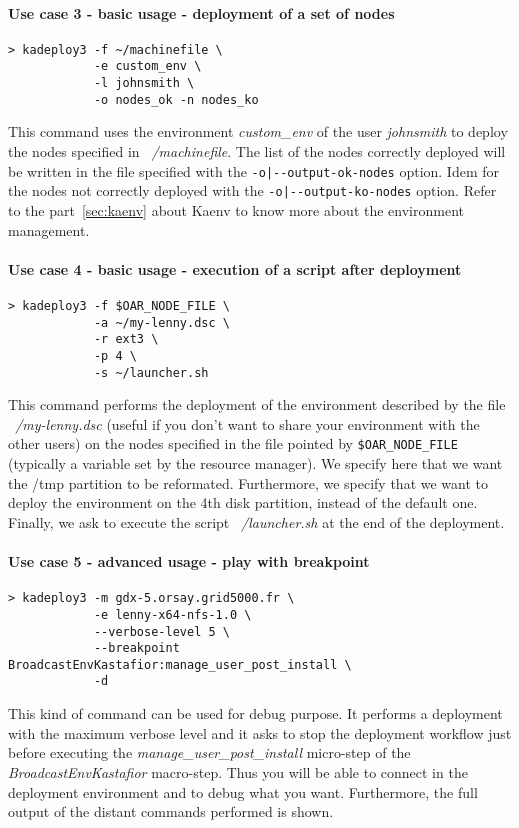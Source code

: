 \documentclass[a4wide,10pt,oneside]{book}
\begin{document}
\paragraph{Use case 3 - basic usage - deployment of a set of nodes}
\begin{verbatim}
> kadeploy3 -f ~/machinefile \
            -e custom_env \
            -l johnsmith \
            -o nodes_ok -n nodes_ko
\end{verbatim}
This command uses the environment \textit{custom\_env} of the user \textit{johnsmith} to deploy the nodes specified in \textit{~/machinefile}. The list of the nodes correctly deployed will be written in the file specified with the \texttt{-o|-{}-output-ok-nodes} option. Idem for the nodes not correctly deployed with the \texttt{-o|-{}-output-ko-nodes} option. Refer to the part~\ref{sec:kaenv} about Kaenv to know more about the environment management.

\paragraph{Use case 4 - basic usage - execution of a script after deployment}
\begin{verbatim}
> kadeploy3 -f $OAR_NODE_FILE \
            -a ~/my-lenny.dsc \
            -r ext3 \
            -p 4 \
            -s ~/launcher.sh
\end{verbatim}
This command performs the deployment of the environment described by the file \textit{~/my-lenny.dsc} (useful if you don't want to share your environment with the other users) on the nodes specified in the file pointed by \texttt{\$OAR\_NODE\_FILE} (typically a variable set by the resource manager). We specify here that we want the /tmp partition to be reformated. Furthermore, we specify that we want to deploy the environment on the 4th disk partition, instead of the default one. Finally, we ask to execute the script \textit{~/launcher.sh} at the end of the deployment.

\paragraph{Use case 5 - advanced usage - play with breakpoint}
\begin{verbatim}
> kadeploy3 -m gdx-5.orsay.grid5000.fr \
            -e lenny-x64-nfs-1.0 \
            --verbose-level 5 \
            --breakpoint BroadcastEnvKastafior:manage_user_post_install \
            -d
\end{verbatim}
This kind of command can be used for debug purpose. It performs a deployment with the maximum verbose level and it asks to stop the deployment workflow just before executing the \textit{manage\_user\_post\_install} micro-step of the \textit{BroadcastEnvKastafior} macro-step. Thus you will be able to connect in the deployment environment and to debug what you want. Furthermore, the full output of the distant commands performed is shown.
\end{document}
